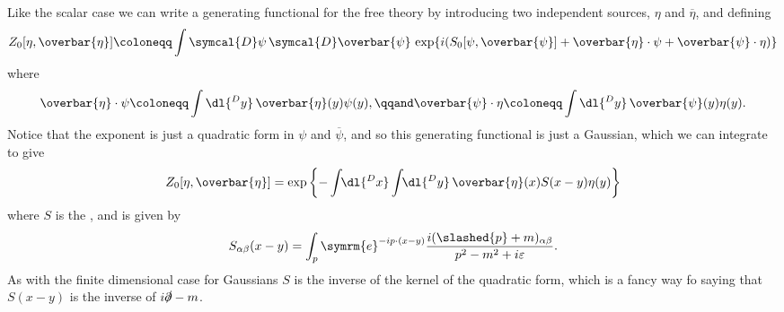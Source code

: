 \documentclass[fleqn]{NotesClass}
\newcommand{\e}{\symrm{e}}
\newcommand{\DL}[1]{\symcal{D}#1}
\newcommand{\DD}[1]{\,\symcal{D}#1}
\newcommand{\diracadjoint}[1]{\overbar{#1}}
\begin{document}
    Like the scalar case we can write a generating functional for the free theory by introducing two independent sources, \(\eta\) and \(\diracadjoint{\eta}\), and defining
    \begin{equation}
        Z_0[\eta, \diracadjoint{\eta}] \coloneqq \int \DL{\psi} \DD{\diracadjoint{\psi}} \, \exp\{i (S_0[\psi, \diracadjoint{\psi}] + \diracadjoint{\eta} \cdot \psi + \diracadjoint{\psi} \cdot \eta)\}
    \end{equation}
    where
    \begin{equation}
        \diracadjoint{\eta} \cdot \psi \coloneqq \int \dl{^Dy} \, \diracadjoint{\eta}(y) \psi(y), \qqand \diracadjoint{\psi} \cdot \eta \coloneqq \int \dl{^Dy} \, \diracadjoint{\psi}(y) \eta(y).
    \end{equation}
    Notice that the exponent is just a quadratic form in \(\psi\) and \(\diracadjoint{\psi}\), and so this generating functional is just a Gaussian, which we can integrate to give
    \begin{equation}
        Z_0[\eta, \diracadjoint{\eta}] = \exp\left\{ -\int\!\!\dl{^Dx} \int\!\!\dl{^Dy} \, \diracadjoint{\eta}(x) S(x - y) \eta(y) \right\}
    \end{equation}
    where \(S\) is the , and is given by
    \begin{equation}
        S_{\alpha\beta}(x - y) = \int_p \e^{-ip\cdot(x - y)} \frac{i(\slashed{p} + m)_{\alpha\beta}}{p^2 - m^2 + i\varepsilon}.
    \end{equation}
    As with the finite dimensional case for Gaussians \(S\) is the inverse of the kernel of the quadratic form, which is a fancy way fo saying that \(S(x - y)\) is the inverse of \(i\slashed{\partial} - m\).
    
\end{document}
